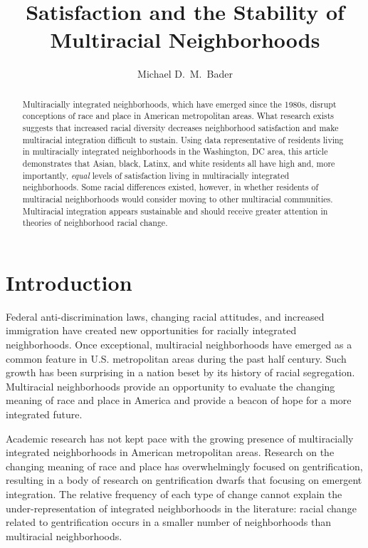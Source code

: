 \documentclass{baderart}
\title{Satisfaction and the Stability of Multiracial Neighborhoods}
\author{Michael D.\ M.\ Bader}
\begin{document}
\maketitle

\begin{abstract}
Multiracially integrated neighborhoods, which have emerged since the 1980s, disrupt conceptions of race and place in American metropolitan areas. What research exists suggests that increased racial diversity decreases neighborhood satisfaction and make multiracial integration difficult to sustain. Using data representative of residents living in multiracially integrated neighborhoods in the Washington, DC area, this article demonstrates that Asian, black, Latinx, and white residents all have high and, more importantly, \emph{equal} levels of satisfaction living in multiracially integrated neighborhoods. Some racial differences existed, however, in whether residents of multiracial neighborhoods would consider moving to other multiracial communities. Multiracial integration appears sustainable and should receive greater attention in theories of neighborhood racial change. 

\end{abstract}

\doublespace

\section{Introduction}\label{introduction}
Federal anti-discrimination laws, changing racial attitudes, and increased immigration have created new opportunities for racially integrated neighborhoods. Once exceptional, multiracial neighborhoods have emerged as a common feature in U.S. metropolitan areas during the past half century. Such growth has been surprising in a nation beset by its history of racial segregation. Multiracial neighborhoods provide an opportunity to evaluate the changing meaning of race and place in America and provide a beacon of hope for a more integrated future.

Academic research has not kept pace with the growing presence of multiracially integrated neighborhoods in American metropolitan areas. Research on the changing meaning of race and place has overwhelmingly focused on gentrification, resulting in a body of research on gentrification dwarfs that focusing on emergent integration. The relative frequency of each type of change cannot explain the under-representation of integrated neighborhoods in the literature: racial change related to gentrification occurs in a smaller number of neighborhoods than multiracial neighborhoods. 
\end{document}
